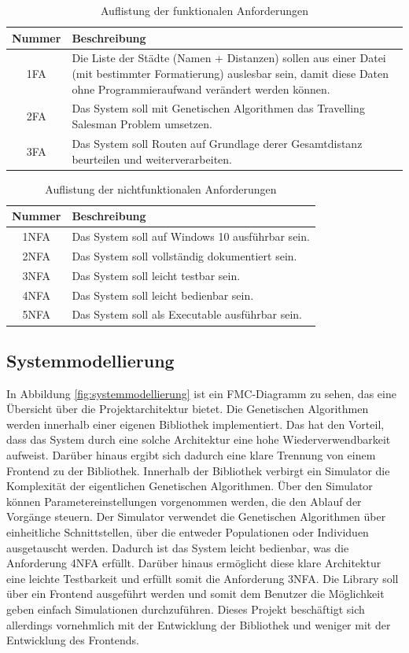 \begin{table}[H]
\caption{Auflistung der funktionalen Anforderungen}
\begin{tabular}{|c|p{12.5cm}|}
Nummer & Beschreibung \\
\hline
1FA & Die Liste der Städte (Namen + Distanzen) sollen aus einer Datei (mit bestimmter Formatierung) auslesbar sein, damit diese Daten ohne Programmieraufwand verändert werden können. \\  
2FA & Das System soll mit Genetischen Algorithmen das Travelling Salesman Problem umsetzen. \\  
3FA & Das System soll Routen auf Grundlage derer Gesamtdistanz beurteilen und weiterverarbeiten. \\  
\end{tabular}
\label{tab:fa}
\end{table}
\begin{table}[H]
\caption{Auflistung der nichtfunktionalen Anforderungen}
\begin{tabular}{|c|p{12.5cm}|}
 Nummer & Beschreibung \\ 
\hline
1NFA & Das System soll auf Windows 10 ausführbar sein.\\
2NFA & Das System soll vollständig dokumentiert sein.\\
3NFA & Das System soll leicht testbar sein.\\
4NFA & Das System soll leicht bedienbar sein.\\
5NFA & Das System soll als Executable ausführbar sein.\\
\end{tabular}
\label{tab:nfa}
\end{table}

\subsection{Systemmodellierung}
In Abbildung \ref{fig:systemmodellierung} ist ein FMC-Diagramm zu sehen, das eine Übersicht über die Projektarchitektur bietet.
Die Genetischen Algorithmen werden innerhalb einer eigenen Bibliothek implementiert. Das hat den Vorteil, dass das System durch eine solche Architektur eine hohe Wiederverwendbarkeit aufweist. Darüber hinaus ergibt sich dadurch eine klare Trennung von einem Frontend zu der Bibliothek.
Innerhalb der Bibliothek verbirgt ein Simulator die Komplexität der eigentlichen Genetischen Algorithmen. Über den Simulator können Parametereinstellungen vorgenommen werden, die den Ablauf der Vorgänge steuern.
Der Simulator verwendet die Genetischen Algorithmen über einheitliche Schnittstellen, über die entweder Populationen oder Individuen ausgetauscht werden. Dadurch ist das System leicht bedienbar, was die Anforderung 4NFA erfüllt. Darüber hinaus ermöglicht diese klare Architektur eine leichte Testbarkeit und erfüllt somit die Anforderung 3NFA. Die Library soll über ein Frontend ausgeführt werden und somit dem Benutzer die Möglichkeit geben einfach Simulationen durchzuführen. Dieses Projekt beschäftigt sich allerdings vornehmlich mit der Entwicklung der Bibliothek und weniger mit der Entwicklung des Frontends.

